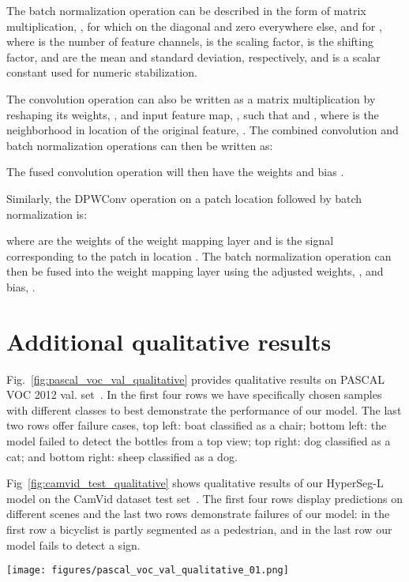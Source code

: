 \documentclass[final]{cvpr}
\begin{document}
The batch normalization operation can be described in the form of matrix multiplication, , 
for which  on the diagonal and zero everywhere else, 
and  for , where  is the number of feature channels,  is the scaling factor,  is the shifting factor,  and  are the mean and standard deviation, respectively, and  is a scalar constant used for numeric stabilization.

The convolution operation can also be written as a matrix multiplication by reshaping its weights, , and input feature map, , such that  and , where  is the  neighborhood in location  of the original feature, . The combined convolution and batch normalization operations can then be written as:

The fused convolution operation will then have the weights  and bias 
.

Similarly, the DPWConv operation on a patch location  followed by batch normalization is:

where  are the weights of the weight mapping layer and  is the signal corresponding to the patch in location .
The batch normalization operation can then be fused into the weight mapping layer using the adjusted weights, 
, and bias, .


\section{Additional qualitative results}
\label{sec:Additional qualitative results}

Fig.~\ref{fig:pascal_voc_val_qualitative} provides qualitative results on PASCAL VOC 2012 val. set~\cite{everingham2010pascal}. In the first four rows we have specifically chosen samples with different classes to best demonstrate the performance of our model. The last two rows offer failure cases, top left: boat classified as a chair; bottom left: the model failed to detect the bottles from a top view; top right: dog classified as a cat; and bottom right: sheep classified as a dog.

Fig~\ref{fig:camvid_test_qualitative} shows qualitative results of our HyperSeg-L model on the CamVid dataset test set~\cite{brostow2009semantic}. The first four rows display predictions on different scenes and the last two rows demonstrate failures of our model: in the first row a bicyclist is partly segmented as a pedestrian, and in the last row our model fails to detect a sign.

\begin{figure*}[t]
\centering
\texttt{[image: figures/pascal\_voc\_val\_qualitative\_01.png]}\vspace{0mm}
\caption{
\emph{Qualitative results on PASCAL VOC 2012 validation set~\cite{everingham2010pascal}.} First and 4th columns: input image, 2nd and 5th columns: our predictions, and 3rd and final column: ground truth. The first four rows demonstrate how our model performs on different classes. The last two rows present failure cases of our model.
}
\label{fig:pascal_voc_val_qualitative}
\end{figure*}
\end{document}
